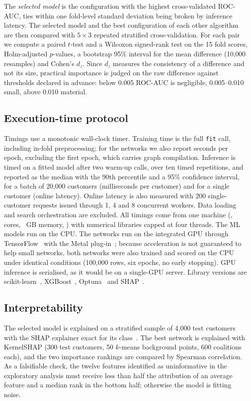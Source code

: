 \documentclass[conference]{IEEEtran}
\begin{document}
The \emph{selected model} is the configuration with the highest cross-validated ROC-AUC, ties within one fold-level standard deviation being broken by inference latency. The selected model and the best configuration of each other algorithm are then compared with $5\times3$ repeated stratified cross-validation. For each pair we compute a paired $t$-test and a Wilcoxon signed-rank test on the 15 fold scores, Holm-adjusted $p$-values, a bootstrap 95\% interval for the mean difference (10,000 resamples) and Cohen's $d_z$. Since $d_z$ measures the consistency of a difference and not its size, practical importance is judged on the raw difference against thresholds declared in advance: below 0.005 ROC-AUC is negligible, 0.005--0.010 small, above 0.010 material.

\subsection{Execution-time protocol}
Timings use a monotonic wall-clock timer. Training time is the full \texttt{fit} call, including in-fold preprocessing; for the networks we also report seconds per epoch, excluding the first epoch, which carries graph compilation. Inference is timed on a fitted model after two warm-up calls, over ten timed repetitions, and reported as the median with the 90th percentile and a 95\% confidence interval, for a batch of 20,000 customers (milliseconds per customer) and for a single customer (online latency). Online latency is also measured with 200 single-customer requests issued through 1, 4 and 8 concurrent workers. Data loading and search orchestration are excluded. All timings come from one machine (\HwChip{}, \HwCores{} cores, \HwRam{}~GB memory, \HwOs{}) with numerical libraries capped at four threads. The ML models run on the CPU. The networks run on the integrated GPU through TensorFlow~\TfVersion{} with the Metal plug-in~\MetalVersion{}; because acceleration is not guaranteed to help small networks, both networks were also trained and scored on the CPU under identical conditions (100,000 rows, six epochs, no early stopping). GPU inference is serialised, as it would be on a single-GPU server. Library versions are scikit-learn~\SkVersion{}, XGBoost~\XgbVersion{}, Optuna~\OptunaVersion{} and SHAP~\ShapVersion{}.

\subsection{Interpretability}\label{sec:shap}
The selected model is explained on a stratified sample of 4,000 test customers with the SHAP explainer exact for its class~\cite{lundberg2017unified}. The best network is explained with KernelSHAP (300 test customers, 50 $k$-means background points, 600 coalitions each), and the two importance rankings are compared by Spearman correlation. As a falsifiable check, the twelve features identified as uninformative in the exploratory analysis must receive less than half the attribution of an average feature and a median rank in the bottom half; otherwise the model is fitting noise.
\end{document}
